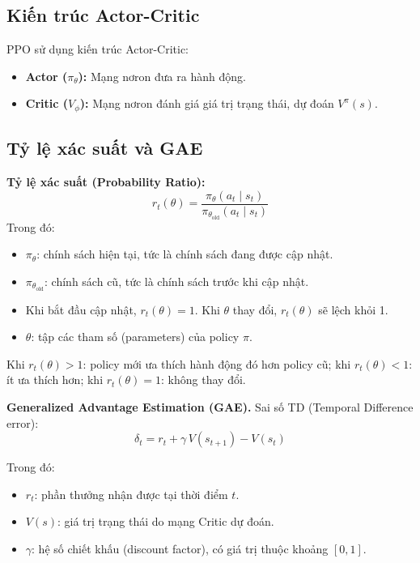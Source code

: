\begin{itemize}
\subsection{Kiến trúc Actor-Critic}

PPO sử dụng kiến trúc Actor-Critic:
\begin{itemize}
    \item \textbf{Actor ($\pi_\theta$):} Mạng nơron đưa ra hành động.
    \item \textbf{Critic ($V_\phi$):} Mạng nơron đánh giá giá trị trạng thái,
    dự đoán $V^\pi(s)$.
\end{itemize}

\subsection{Tỷ lệ xác suất và GAE}

\textbf{Tỷ lệ xác suất (Probability Ratio):}
\begin{equation}
    r_t(\theta) = \frac{\pi_\theta(a_t \mid s_t)}{\pi_{\theta_\text{old}}(a_t \mid s_t)}
    \label{eq:prob_ratio}
\end{equation}
Trong đó:
\begin{itemize}[leftmargin=1.5cm]
    \item $\pi_\theta$: chính sách hiện tại, tức là chính sách đang được cập nhật.
    \item $\pi_{\theta_{\text{old}}}$: chính sách cũ, tức là chính sách trước khi cập nhật.
    \item Khi bắt đầu cập nhật, $r_t(\theta) = 1$. Khi $\theta$ thay đổi, $r_t(\theta)$ sẽ lệch khỏi 1.
    \item $\theta$: tập các tham số (parameters) của policy $\pi$.
\end{itemize}
Khi $r_t(\theta) > 1$: policy mới ưa thích hành động đó hơn policy cũ;
khi $r_t(\theta) < 1$: ít ưa thích hơn; khi $r_t(\theta) = 1$: không thay đổi.

\textbf{Generalized Advantage Estimation (GAE).}
Sai số TD (Temporal Difference error):
\begin{equation}
    \delta_t = r_t + \gamma\, V(s_{t+1}) - V(s_t)
    \label{eq:td_error}
\end{equation}

Trong đó:
\begin{itemize}[leftmargin=1.5cm]
    \item $r_t$: phần thưởng nhận được tại thời điểm $t$.
    \item $V(s)$: giá trị trạng thái do mạng Critic dự đoán.
    \item $\gamma$: hệ số chiết khấu (discount factor), có giá trị thuộc khoảng $[0,1]$.
\end{itemize}


\end{itemize}
